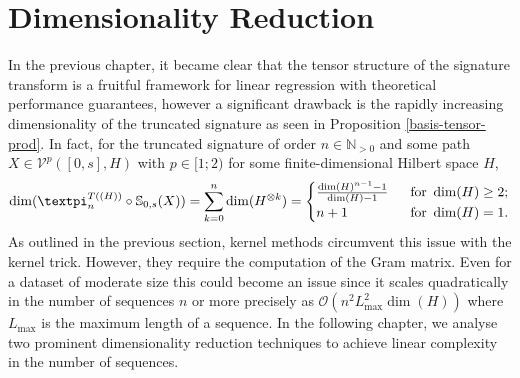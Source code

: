 \documentclass[openany]{book}
\begin{document}
\chapter{Dimensionality Reduction}
In the previous chapter, it became clear that the tensor structure of the signature transform is a fruitful framework for linear regression with theoretical performance guarantees, however a significant drawback is the rapidly increasing dimensionality of the truncated signature as seen in Proposition \ref{basis-tensor-prod}.
In fact, for the truncated signature of order $n\in \mathbb N_{>0}$ and some path $X\in \mathscr V^{p}([0,s], H)$ with $p\in [1;2)$ for some finite-dimensional Hilbert space $H$,
\begin{equation*}
    \dim(\gpi_n^{T((H))}\circ \mathbb S_{0,s}(X))=\sum_{k=0}^n\dim(H^{\otimes k})=\begin{cases}
        \frac{\dim(H)^{n-1}-1}{\dim(H)-1}&\;\textrm{ for }\dim(H)\geq 2;
        \\ n+1 &\;\textrm{ for }\dim(H)= 1.
    \end{cases}
\end{equation*}
As outlined in the previous section, kernel methods circumvent this issue with the kernel trick. However, they require the computation of the Gram matrix. Even for a dataset of moderate size this could become an issue since it scales quadratically in the number of sequences $n$ or more precisely as $\mathscr O(n^2L_{\max}^2\dim(H))$ where $L_{\max}$ \cite{toth2025} is the maximum length of a sequence. In the following chapter, we analyse two prominent dimensionality reduction techniques to achieve linear complexity in the number of sequences.
\end{document}

